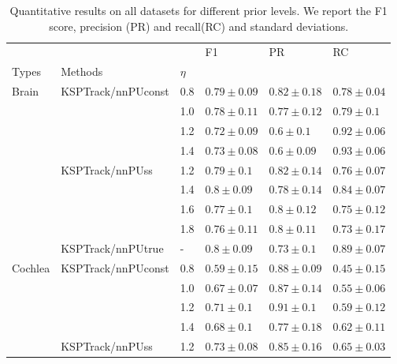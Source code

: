\begin{table*}
\centering
\caption{
    Quantitative results on all datasets for different prior levels. We report the F1 score, precision (PR) and recall(RC) and standard deviations.
    }
\label{tab:results_eta}
\begin{tabular}{llp{1.8cm}p{1.8cm}p{1.8cm}p{1.8cm}}
\toprule
        &                   &   &               F1 &               PR &               RC \\
Types & Methods & $\eta$ &                  &                  &                  \\
\midrule
\multirow{9}{*}{Brain} & \multirow{4}{*}{KSPTrack/nnPUconst} & 0.8 &  $0.79 \pm 0.09$ &  $0.82 \pm 0.18$ &  $0.78 \pm 0.04$ \\
        &                   & 1.0 &  $0.78 \pm 0.11$ &  $0.77 \pm 0.12$ &   $0.79 \pm 0.1$ \\
        &                   & 1.2 &  $0.72 \pm 0.09$ &    $0.6 \pm 0.1$ &  $0.92 \pm 0.06$ \\
        &                   & 1.4 &  $0.73 \pm 0.08$ &   $0.6 \pm 0.09$ &  $0.93 \pm 0.06$ \\
\cline{2-6}
        & \multirow{4}{*}{KSPTrack/nnPUss} & 1.2 &   $0.79 \pm 0.1$ &  $0.82 \pm 0.14$ &  $0.76 \pm 0.07$ \\
        &                   & 1.4 &   $0.8 \pm 0.09$ &  $0.78 \pm 0.14$ &  $0.84 \pm 0.07$ \\
        &                   & 1.6 &   $0.77 \pm 0.1$ &   $0.8 \pm 0.12$ &  $0.75 \pm 0.12$ \\
        &                   & 1.8 &  $0.76 \pm 0.11$ &   $0.8 \pm 0.11$ &  $0.73 \pm 0.17$ \\
\cline{2-6}
        & KSPTrack/nnPUtrue & - &   $0.8 \pm 0.09$ &   $0.73 \pm 0.1$ &  $0.89 \pm 0.07$ \\
\cline{1-6}
\multirow{9}{*}{Cochlea} & \multirow{4}{*}{KSPTrack/nnPUconst} & 0.8 &  $0.59 \pm 0.15$ &  $0.88 \pm 0.09$ &  $0.45 \pm 0.15$ \\
        &                   & 1.0 &  $0.67 \pm 0.07$ &  $0.87 \pm 0.14$ &  $0.55 \pm 0.06$ \\
        &                   & 1.2 &   $0.71 \pm 0.1$ &   $0.91 \pm 0.1$ &  $0.59 \pm 0.12$ \\
        &                   & 1.4 &   $0.68 \pm 0.1$ &  $0.77 \pm 0.18$ &  $0.62 \pm 0.11$ \\
\cline{2-6}
        & \multirow{4}{*}{KSPTrack/nnPUss} & 1.2 &  $0.73 \pm 0.08$ &  $0.85 \pm 0.16$ &  $0.65 \pm 0.03$ \\

\end{tabular}
\end{table*}

